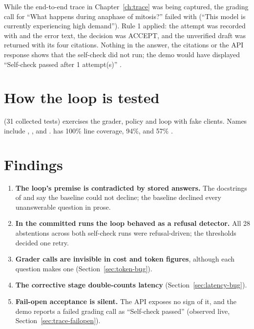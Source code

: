 \begin{measured}
While the end-to-end trace in Chapter~\ref{ch:trace} was being captured, the grading call for \enquote{What happens during anaphase of mitosis?} failed with  (\enquote{This model is currently experiencing high demand}). Rule 1 applied: the attempt was recorded with  and the error text, the decision was ACCEPT, and the unverified draft was returned with its four citations. Nothing in the answer, the citations or the API response shows that the self-check did not run; the demo would have displayed \enquote{Self-check passed after 1 attempt(s)} .
\end{measured}

\section{How the loop is tested}

 (31 collected tests) exercises the grader, policy and loop with fake clients. Names include , ,  and .  has 100\% line coverage,  94\%, and  57\% \tagM.

\section{Findings}

\begin{enumerate}
  \item \textbf{The loop's premise is contradicted by stored answers.} The docstrings of  and  say the baseline could not decline; the baseline declined every unanswerable question in prose. \tagV
  \item \textbf{In the committed runs the loop behaved as a refusal detector.} All 28 abstentions across both self-check runs were refusal-driven; the thresholds decided one retry. \tagV
  \item \textbf{Grader calls are invisible in cost and token figures}, although each question makes one (Section~\ref{sec:token-bug}). \tagV
  \item \textbf{The corrective stage double-counts latency} (Section~\ref{sec:latency-bug}). \tagV
  \item \textbf{Fail-open acceptance is silent.} The API exposes no sign of it, and the demo reports a failed grading call as \enquote{Self-check passed} (observed live, Section~\ref{sec:trace-failopen}). \tagV
\end{enumerate}

